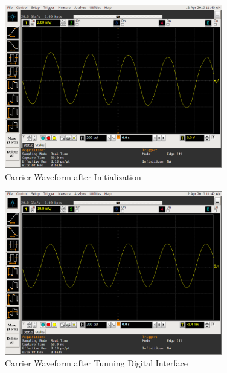 \begin{figure}[htbp]
    \centering
    \includegraphics[width=0.85\textwidth]{./figures/oscill_init}
    \caption{ Carrier Waveform after Initialization
    \label{fig:oscillinit}}
\end{figure}

\begin{figure}[htbp]
    \centering
    \includegraphics[width=0.85\textwidth]{./figures/oscill_dig}
    \caption{ Carrier Waveform after Tunning Digital Interface
    \label{fig:oscilldig}}
\end{figure}

